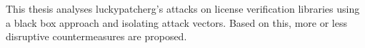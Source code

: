 This thesis analyses \gls{luckypatcherg}’s attacks on license verification libraries using a black box approach and isolating attack vectors.
Based on this, more or less disruptive countermeasures are proposed.
